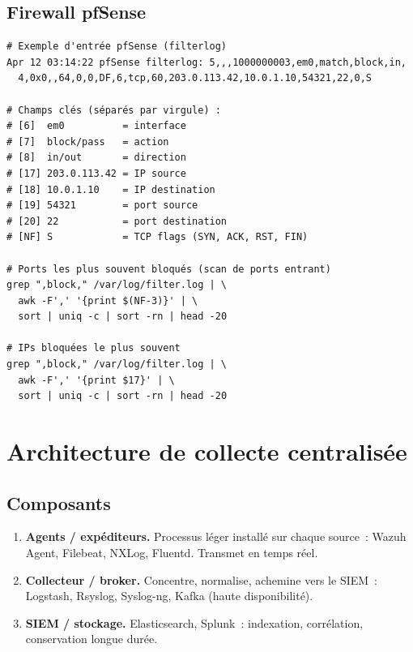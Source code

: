 \subsection{Firewall pfSense}

\begin{lstlisting}[style=StyleTerminal,
  caption={Log pfSense --- format CSV via Syslog},
  label={lst:pfsense-log}]
# Exemple d'entrée pfSense (filterlog)
Apr 12 03:14:22 pfSense filterlog: 5,,,1000000003,em0,match,block,in,
  4,0x0,,64,0,0,DF,6,tcp,60,203.0.113.42,10.0.1.10,54321,22,0,S

# Champs clés (séparés par virgule) :
# [6]  em0          = interface
# [7]  block/pass   = action
# [8]  in/out       = direction
# [17] 203.0.113.42 = IP source
# [18] 10.0.1.10    = IP destination
# [19] 54321        = port source
# [20] 22           = port destination
# [NF] S            = TCP flags (SYN, ACK, RST, FIN)

# Ports les plus souvent bloqués (scan de ports entrant)
grep ",block," /var/log/filter.log | \
  awk -F',' '{print $(NF-3)}' | \
  sort | uniq -c | sort -rn | head -20

# IPs bloquées le plus souvent
grep ",block," /var/log/filter.log | \
  awk -F',' '{print $17}' | \
  sort | uniq -c | sort -rn | head -20
\end{lstlisting}

\section{Architecture de collecte centralisée}
\label{sec:collecte-centrale}

\subsection{Composants}

\begin{enumerate}
  \item \textbf{Agents / expéditeurs.} Processus léger installé sur chaque source~:
        Wazuh Agent, Filebeat, NXLog, Fluentd. Transmet en temps réel.
  \item \textbf{Collecteur / broker.} Concentre, normalise, achemine vers le SIEM~:
        Logstash, Rsyslog, Syslog-ng, Kafka (haute disponibilité).
  \item \textbf{SIEM / stockage.} Elasticsearch, Splunk~: indexation, corrélation,
        conservation longue durée.
\end{enumerate}


